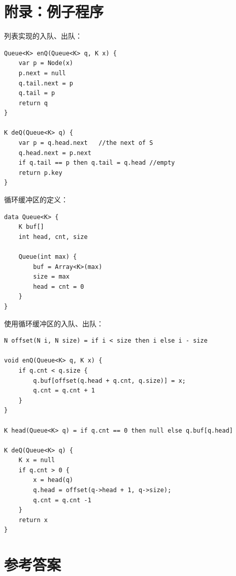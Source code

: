 \documentclass[b5paper]{ctexart}
\begin{document}
\section{附录：例子程序}

列表实现的入队、出队：

\begin{lstlisting}[language = Bourbaki]
Queue<K> enQ(Queue<K> q, K x) {
    var p = Node(x)
    p.next = null
    q.tail.next = p
    q.tail = p
    return q
}

K deQ(Queue<K> q) {
    var p = q.head.next   //the next of S
    q.head.next = p.next
    if q.tail == p then q.tail = q.head //empty
    return p.key
}
\end{lstlisting}

循环缓冲区的定义：

\begin{lstlisting}[language = Bourbaki]
data Queue<K> {
    K buf[]
    int head, cnt, size

    Queue(int max) {
        buf = Array<K>(max)
        size = max
        head = cnt = 0
    }
}
\end{lstlisting}

使用循环缓冲区的入队、出队：

\begin{lstlisting}
N offset(N i, N size) = if i < size then i else i - size

void enQ(Queue<K> q, K x) {
    if q.cnt < q.size {
        q.buf[offset(q.head + q.cnt, q.size)] = x;
        q.cnt = q.cnt + 1
    }
}

K head(Queue<K> q) = if q.cnt == 0 then null else q.buf[q.head]

K deQ(Queue<K> q) {
    K x = null
    if q.cnt > 0 {
        x = head(q)
        q.head = offset(q->head + 1, q->size);
        q.cnt = q.cnt -1
    }
    return x
}
\end{lstlisting}

\ifx\wholebook\relax \else
\section{参考答案}
\shipoutAnswer
\end{document}
